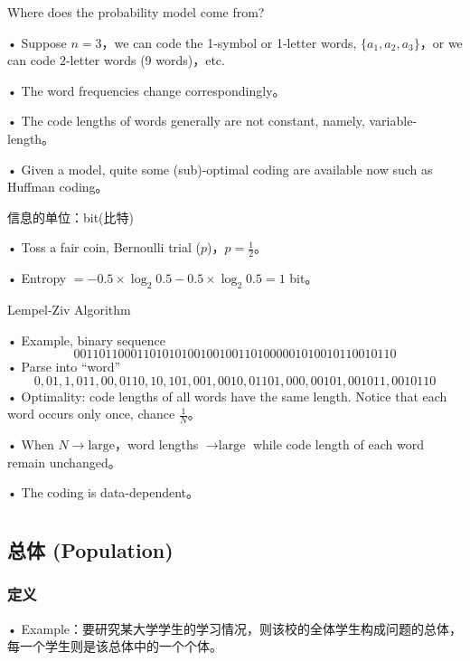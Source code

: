 \documentclass[UTF8]{report}
\theoremstyle{MyLineTheoremStyle} %
\theoremstyle{MyBlockTheoremStyle} %
\theoremstyle{MySubsubsectionStyle} %
\begin{document}
\vspace{1cm}

Where does the probability model come from?\par
• Suppose $n = 3$，we can code the 1-symbol or 1-letter words, $\{a_1, a_2, a_3\}$，or we can code 2-letter words (9 words)，etc.\par
• The word frequencies change correspondingly。\par
• The code lengths of words generally are not constant, namely, variable-length。\par
• Given a model, quite some (sub)-optimal coding are available now such as Huffman coding。\par

\vspace{1cm}

信息的单位：bit(比特)\par
• Toss a fair coin, Bernoulli trial ($p$)，$p = \frac{1}{2}$。\par
• Entropy $= -0.5 \times \log_2 0.5 - 0.5 \times \log_2 0.5 = 1$ bit。\par

\vspace{1cm}

Lempel-Ziv Algorithm\par
• Example, binary sequence
\[
001101100011010101001001001101000001010010110010110
\]
• Parse into “word”
\[
0, 01, 1, 011, 00, 0110, 10, 101, 001, 0010, 01101, 000, 00101, 001011, 0010110
\]
• Optimality: code lengths of all words have the same length. Notice that each word occurs only once, chance $\frac{1}{N}$。\par
• When $N \to \text{large}$，word lengths $\to \text{large}$ while code length of each word remain unchanged。\par
• The coding is data-dependent。

\chapter{}

\section{总体 (Population)}
\subsection{定义}
• Example：要研究某大学学生的学习情况，则该校的全体学生构成问题的总体，每一个学生则是该总体中的一个个体。
\end{document}
